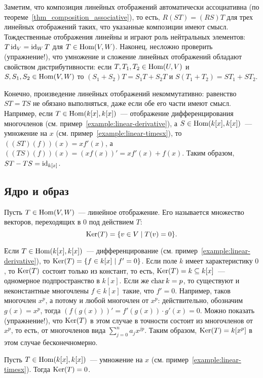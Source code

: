 Заметим, что композиция линейных отображений автоматически
ассоциативна (по теореме~\ref{thm_composition_associative}),
то есть, $R(ST) = (RS)T$ для трех линейных отображений таких,
что указанные композиции имеют смысл.
Тождественные отображения линейны и играют роль нейтральных
элементов: $T\operatorname{id}_V = \operatorname{id}_W T$ для $T\in\operatorname{Hom}(V,W)$.
Наконец, несложно проверить (упражнение!), что
умножение и сложение линейных отображений обладают свойством
дистрибутивности: если $T,T_1,T_2\in\operatorname{Hom}(U,V)$
и $S,S_1,S_2\in\operatorname{Hom}(V,W)$
то $(S_1+S_2)T = S_1T + S_2T$ и $S(T_1+T_2) = ST_1 + ST_2$.

Конечно, произведение линейных отображений некоммутативно:
равенство $ST=TS$ не обязано выполняться, даже если обе его
части имеют смысл. Например, если $T\in\operatorname{Hom}(k[x],k[x])$~---
отображение дифференцирования многочленов
(см. пример~\ref{example:linear-derivative}),
а $S\in\operatorname{Hom}(k[x],k[x])$~--- умножение на $x$
(см. пример~\ref{example:linear-timesx}),
то $((ST)(f))(x) = xf'(x)$,
а $((TS)(f))(x) = (xf(x))' = xf'(x) + f(x)$.
Таким образом, $ST-TS = \operatorname{id}_{k[x]}$.

\subsection{Ядро и образ}


\begin{definition}
Пусть $T\in\operatorname{Hom}(V,W)$~--- линейное отображение. Его
 называется множество векторов, переходящих
в $0$ под действием $T$:
$$
\operatorname{Ker}(T) = \{v\in V\mid T(v) = 0\}.
$$
\end{definition}

\begin{example}
Если $T\in\operatorname{Hom}(k[x],k[x])$~--- дифференцирование
(см. пример~\ref{example:linear-derivative}), то
$\operatorname{Ker}(T) = \{f\in k[x] \mid f'=0\}$. Если поле $k$
имеет характеристику $0$, то $\operatorname{Ker}(T)$ состоит только из
констант, то есть, $\operatorname{Ker}(T) = k\subseteq k[x]$~--- одномерное
подпространство в $k[x]$. Если же
$\operatorname{char} k = p$, то существуют и неконстантные многочлены
$f\in k[x]$
такие, что $f'=0$. Например, таков многочлен $x^p$,
а потому и любой многочлен от $x^p$: действительно,
обозначим $g(x) = x^p$, тогда
$(f(g(x)))' = f'(g(x))\cdot g'(x) = 0$.
Можно показать (упражнение!),
что $\operatorname{Ker}(T)$ в этом случае в точности состоит
из многочленов от $x^p$, то есть, от многочленов вида
$\sum_{j=0}^n a_j x^{jp}$. Таким образом,
$\operatorname{Ker}(T) = k[x^p]$ в этом случае бесконечномерно.
\end{example}
\begin{example}
Пусть $T\in\operatorname{Hom}(k[x],k[x])$~--- умножение на $x$
(см. пример~\ref{example:linear-timesx}).
Тогда $\operatorname{Ker}(T) = 0$.
\end{example}

